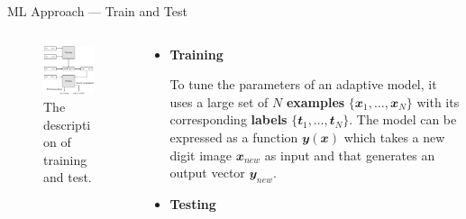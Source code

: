 \documentclass{bredelebeamer}
\begin{document}
\begin{frame}{ML Approach --- Train and Test}
  \begin{columns}
    \begin{column}{0.4\textwidth}
      \begin{figure}[h]
      \centering
      \includegraphics[scale=0.5]{desc_training_test.pdf}
      \caption{
        The description of training and test.
      }
      \end{figure}
    \end{column}
    \begin{column}{0.6\textwidth}
      \begin{itemize}
        \item \textbf{Training} \\
        \begin{justify}
          To tune the parameters of an adaptive model, it uses a large set of $N$
          \textbf{examples} $\{\mathbfit{x}_1,\ldots,\mathbfit{x}_N\}$ with its
          corresponding \textbf{labels} $\{\mathbfit{t}_1,\ldots,\mathbfit{t}_N\}$.
          The model can be expressed as a function $\mathbfit{y(x)}$ which takes
          a new digit image $\mathbfit{x}_{new}$ as input and that generates an
          output vector $\mathbfit{y}_{new}$.
        \end{justify}
        \item \textbf{Testing} \\

\end{itemize}
\end{column}
\end{columns}
\end{frame}
\end{document}
